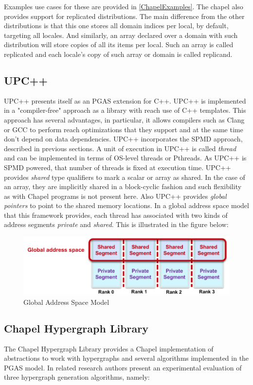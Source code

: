 \documentclass[14pt]{extreport}
\begin{document}
Examples use cases for these are provided in \ref{ChapelExamples}. The chapel also provides support for replicated distributions. The main difference from the other distributions is that this one stores all domain indices per local, by default, targeting all locales. And similarly, an array declared over a domain with such distribution will store copies of all its items per local. Such an array is called replicated and each locale's copy of such array or domain is called replicand.

\subsection{UPC++}
UPC++\cite{upcpp} presents itself as an PGAS extension for C++. UPC++ is implemented in a "compiler-free" approach as a library with reach use of C++ templates. This approach has several advantages, in particular, it allows compilers such as Clang or GCC to perform reach optimizations that they support and at the same time don't depend on data dependencies.
UPC++ incorporates the SPMD approach, described in previous sections. A unit of execution in UPC++ is called \textit{thread} and can be implemented in terms of OS-level threads or Pthreads. As UPC++ is SPMD powered, that number of threads is fixed at execution time.
UPC++ provides \textit{shared} type qualifiers to mark a scalar or array as shared. In the case of an array, they are implicitly shared in a block-cyclic fashion and such flexibility as with Chapel programs is not present here. Also UPC++ provides \textit{global pointers} to point to the shared memory locations. In a global address space model that this framework provides, each thread has associated with two kinds of address segments \textit{private} and \textit{shared}. This is illustrated in the figure below:
\begin{figure}[H]
	\centering
	\includegraphics[scale=0.75]{images/global_address_space.png}
	\caption{Global Address Space Model}
\end{figure}

\subsection{Chapel Hypergraph Library}
The Chapel Hypergraph Library provides a Chapel implementation of abstractions to work with hypergraphs and several algorithms implemented in the PGAS model. In related research \cite{chgl} authors present an experimental evaluation of three hypergraph generation algorithms, namely:
\end{document}
